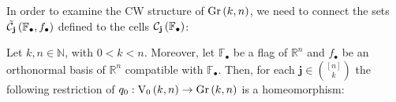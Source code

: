 In order to examine the CW structure of $\Gr{k}{n}$, we need to connect the sets $\tilde{\mathcal{C}}_{\mathbf{j}}\left(\mathbb{F}_{\bullet},f_{\bullet}\right)$ defined to the cells $\mathcal{C}_{\mathbf{j}}\left(\mathbb{F}_{\bullet}\right)$:
\begin{lemma}\label{lem:cells_from_stiefel_to_gr} Let $k,n\in\mathbb{N}$, with $0<k<n$. Moreover, let $\mathbb{F}_{\bullet}$ be a flag of $\mathbb{R}^n$ and $f_{\bullet}$ be an orthonormal basis of $\mathbb{R}^n$ compatible with $\mathbb{F}_{\bullet}$. Then, for each $\mathbf{j}\in\binom{[n]}{k}$ the following restriction of $q_0:\StO{k}{n}\to\Gr{k}{n}$ is a homeomorphism:
\begin{center}
\end{center}
\end{lemma}

